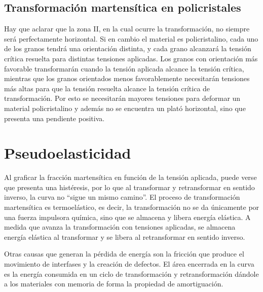 \documentclass[a4paper,12pt,fleqn,twoside,openany]{book}
\begin{document}
\subsection{Transformación martensítica en policristales}
Hay que aclarar que la zona II, en la cual ocurre la transformación, no siempre será perfectamente horizontal. 
Si en cambio el material es policristalino, cada uno de los granos tendrá una orientación distinta, y cada grano alcanzará la tensión crítica resuelta para distintas tensiones aplicadas. Los granos con orientación más favorable transformarán cuando la tensión aplicada alcance la tensión crítica, mientras que los granos orientados menos favorablemente necesitarán tensiones más altas para que la tensión resuelta alcance la tensión crítica de transformación. Por esto se necesitarán mayores tensiones para deformar un material policristalino y además no se encuentra un plató horizontal, sino que presenta una pendiente positiva.


\section{Pseudoelasticidad}

Al graficar la fracción martensítica en función de la tensión aplicada, puede verse que presenta una histéresis, por lo que al transformar y 
retransformar en sentido inverso, la curva no “sigue un mismo camino”. El proceso de transformación martensítica es termoelástico, es decir, la transformación 
no se da únicamente por una fuerza impulsora química, sino que se almacena y libera energía elástica. A medida que avanza la transformación con tensiones aplicadas, 
se almacena energía elástica al transformar y se libera al retransformar en sentido inverso. 

Otras causas que generan la pérdida de energía son la fricción que produce el 
movimiento de interfases y la creación de defectos. El área encerrada en la curva es la energía consumida en un ciclo de transformación y retransformación dándole a los 
materiales con memoria de forma la propiedad de amortiguación.


\end{document}
